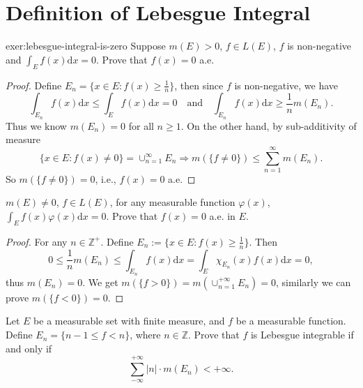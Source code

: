 
\section{Definition of Lebesgue Integral}

\begin{exercise}{}{exer:lebesgue-integral-is-zero}
  Suppose $m (E) > 0$, $f \in L(E)$, $f$ is non-negative and $\int_E f(x)\mathrm{d} x = 0$.
  Prove that $f(x) = 0$ a.e.
\end{exercise}

\begin{proof}
  Define $E_n = \{x \in E: f(x) \geq \frac{1}{n}\}$,
  then since $f$ is non-negative, we have
  \begin{equation}
    \int_{E_n} f(x)\mathrm{d} x \leq \int_E f(x)\mathrm{d} x = 0
    \quad
    \text{and}
    \quad
    \int_{E_n} f(x) \mathrm{d} x \geq \frac{1}{n} m(E_n).
  \end{equation}
  Thus we know $m(E_n) = 0$ for all $n \geq 1$.
  On the other hand, by sub-additivity of measure
  \begin{equation}
    \{x \in E: f(x) \neq 0\} = \cup_{n = 1}^{\infty} E_n
    \Rightarrow
    m(\{f \neq 0\}) \leq \sum_{n = 1}^{\infty} m(E_n).
  \end{equation}
  So $m(\{f \neq 0\}) = 0$, i.e., $f(x) = 0$ a.e.
\end{proof}

\begin{exercise}{}{}
  $m (E) \neq 0$, $f \in L(E)$, for any measurable function $\varphi(x)$,
  $\int_E f(x)\varphi(x)\mathrm{d} x = 0$. Prove that $f(x) = 0$ a.e. in $E$.
\end{exercise}

\begin{proof}
  For any $n \in \mathbb{Z}^+$. Define $E_n := \{x \in E: f(x) \geq \frac{1}{n}\}$.
  Then
  \begin{equation}
    0 \leq \frac{1}{n} m(E_n) \leq \int_{E_n} f(x)\mathrm{d} x = \int_E \chi_{E_n}(x) f(x)\mathrm{d} x = 0,
  \end{equation}
  thus $m(E_n) = 0$.
  We get $m(\{f > 0\}) = m(\cup_{n=1}^{+\infty} E_n) = 0$, similarly we can prove $m(\{f < 0\}) = 0$.
\end{proof}

\begin{exercise}{}{}
  Let $E$ be a measurable set with finite measure, and $f$ be a measurable function.
  Define $E_n = \{n - 1 \leq f < n\}$, where $n \in \mathbb{Z}$.
  Prove that $f$ is Lebesgue integrable if and only if
  \begin{equation}
    \sum\limits_{- \infty}^{+\infty} |n| \cdot m(E_n) < +\infty.
  \end{equation}
\end{exercise}

